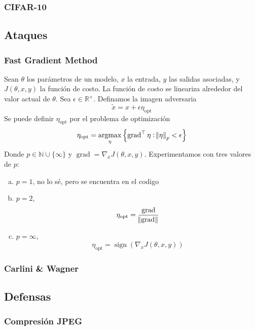\subsubsection{CIFAR-10}
\cite{Krizhevsky09learningmultiple}


\subsection{Ataques}

\subsubsection{Fast Gradient Method}
\cite{goodfellow2015explaining, maybe more}

Sean $\theta$ los parámetros de un modelo, $x$ la entrada, $y$ las salidas asociadas, y $J(\theta, x, y)$ la función de costo. La función de costo se lineariza alrededor del valor actual de $\theta$. Sea $\epsilon \in \mathbb{R}^+$. Definamos la imagen adversaria 
\[\tilde{x} = x + \epsilon \eta_{\text{opt}}\]
Se puede definir $\eta_{\text{opt}}$ por el problema de optimización
\[\eta_{\text{opt}} = \operatornamewithlimits{argmax}_{\eta}\left\{ \operatorname{grad} ^\top \eta: \norm{\eta}_p< \epsilon\right\}\]
Donde $p \in \mathbb{N} \cup \{\infty\}$ y $\operatorname{grad} = \nabla_x J(\theta, x, y)$. Experimentamos con tres valores de $p$:
\begin{enumerate}[a)]
    \item $p = 1$, no lo sé, pero se encuentra en el codigo
    \item $p = 2$,
    \[\eta_{\text{opt}} = \frac{\operatorname{grad}}{\norm{\operatorname{grad}}}\]
    \item $p = \infty$,
    \[\eta_{\text{opt}} = \operatorname{sign}(\nabla_x J(\theta, x, y))\]
\end{enumerate}

\subsubsection{Carlini \& Wagner}
\cite{carlini2017evaluating} 

\subsection{Defensas}

\subsubsection{Compresión JPEG }
\cite{das2017keeping}